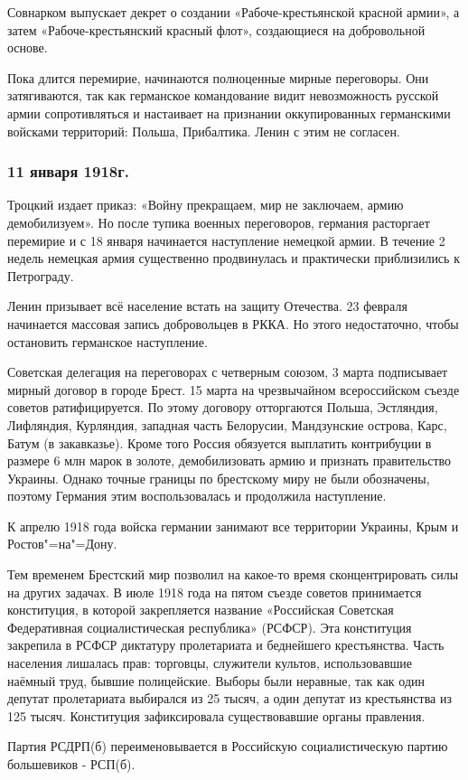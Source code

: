 Совнарком выпускает декрет о создании «Рабоче-крестьянской красной армии», а затем «Рабоче-крестьянский красный флот», создающиеся на добровольной основе.

Пока длится перемирие, начинаются полноценные мирные переговоры. Они затягиваются, так как германское командование видит невозможность русской армии сопротивляться и настаивает на признании оккупированных германскими войсками территорий: Польша, Прибалтика. Ленин с этим не согласен.

\subsubsection{\textbf{11 января 1918г.}}

Троцкий издает приказ: «Войну прекращаем, мир не заключаем, армию демобилизуем». Но после тупика военных переговоров, германия расторгает перемирие и с 18 января начинается наступление немецкой армии. В течение 2 недель немецкая армия существенно продвинулась и практически приблизились к Петрограду.

Ленин призывает всё население встать на защиту Отечества. 23 февраля начинается массовая запись добровольцев в РККА. Но этого недостаточно, чтобы остановить германское наступление.

Советская делегация на переговорах с четверным союзом, 3 марта подписывает мирный договор в городе Брест. 15 марта на чрезвычайном всероссийском съезде советов ратифицируется. По этому договору отторгаются Польша, Эстляндия, Лифляндия, Курляндия, западная часть Белорусии, Мандзунские острова, Карс, Батум (в закавказье). Кроме того Россия обязуется выплатить контрибуции в размере 6 млн марок в золоте, демобилизовать армию и признать правительство Украины. Однако точные границы по брестскому миру не были обозначены, поэтому Германия этим воспользовалась и продолжила наступление.

К апрелю 1918 года войска германии занимают все территории Украины, Крым и Ростов"=на"=Дону.

Тем временем Брестский мир позволил на какое-то время сконцентрировать силы на других задачах. В июле 1918 года на пятом съезде советов принимается конституция, в которой закрепляется название «Российская Советская Федеративная социалистическая республика» (РСФСР). Эта конституция закрепила в РСФСР диктатуру пролетариата и беднейшего крестьянства. Часть населения лишалась прав: торговцы, служители культов, использовавшие наёмный труд, бывшие полицейские. Выборы были неравные, так как один депутат пролетариата выбирался из 25 тысяч, а один депутат из крестьянства из 125 тысяч. Конституция зафиксировала существовавшие органы правления.

Партия РСДРП(б) переименовывается в Российскую социалистическую партию большевиков - РСП(б).